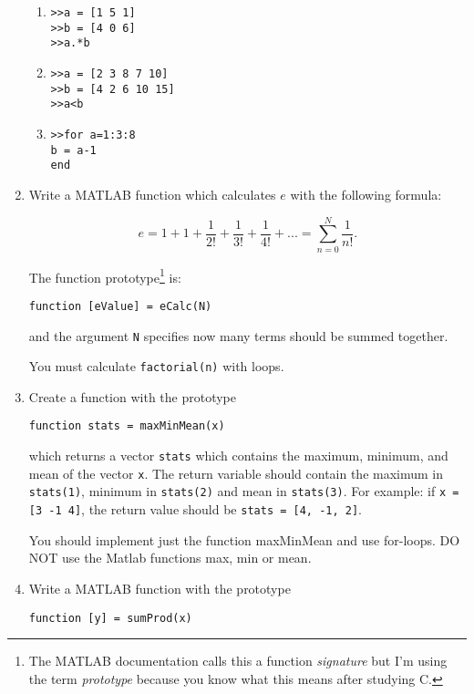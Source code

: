 \documentclass{lab}
\begin{document}
\begin{enumerate}
\begin{enumerate}
\item \texttt{>>a = [1 5 1]}\\
\texttt{>>b = [4 0 6]}\\
\texttt{>>a.*b}

\item \texttt{>>a = [2 3 8 7 10]} \\
\texttt{>>b = [4 2 6 10 15]} \\
\texttt{>>a<b}

\item \texttt{>>for a=1:3:8\\
b = a-1\\
end}
	\end{enumerate}

\item Write a MATLAB function which calculates $e$ with the following formula:

\begin{equation}
e = 1 + 1 + \frac{1}{2!} + \frac{1}{3!} + \frac{1}{4!} + ... = \sum_{n=0}^N \frac{1}{n!}.
\end{equation}

The function prototype\footnote{The MATLAB documentation calls this a function \textit{signature} but I'm using the term \textit{prototype} because you know what this means after studying C.} is:

\begin{lstlisting}[style=pseudo]
function [eValue] = eCalc(N)
\end{lstlisting}

and the argument \texttt{N} specifies now many terms should be summed together.

You must calculate \texttt{factorial(n)} with loops.

\item Create a function with the prototype

\texttt{function stats = maxMinMean(x)}

which returns a vector \texttt{stats} which contains the maximum, minimum, and mean of the vector \texttt{x}. The return variable should contain the maximum in \texttt{stats(1)}, minimum in \texttt{stats(2)} and mean in \texttt{stats(3)}.
For example:
if \texttt{x = [3 -1 4]}, the return value should be \texttt{stats = [4, -1, 2]}.

You should implement just the function maxMinMean and use for-loops. DO NOT use the Matlab functions max, min or mean.

\item Write a MATLAB function with the prototype
\begin{lstlisting}[style=pseudo]
function [y] = sumProd(x)
\end{lstlisting}


\end{enumerate}
\end{document}
